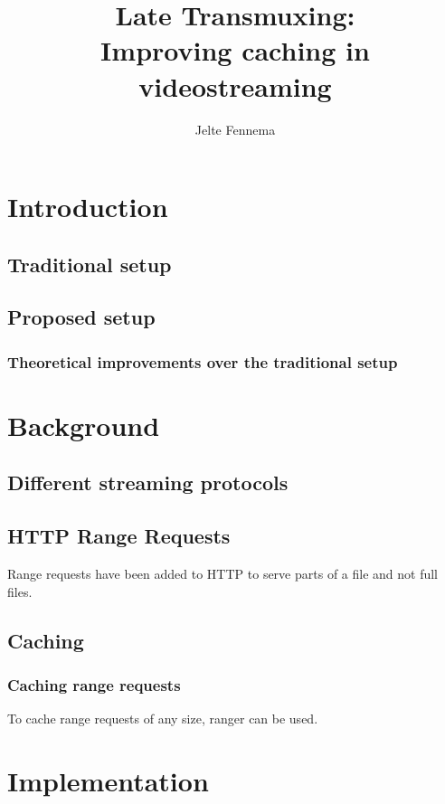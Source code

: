 \documentclass[twoside,openright]{uva-bachelor-thesis}
\title{Late Transmuxing:\\Improving caching in videostreaming}
\author{Jelte Fennema}
\begin{document}
\maketitle

\begin{abstract}
\end{abstract}


\tableofcontents

\chapter{Introduction}
\section{Traditional setup}
\section{Proposed setup}
\subsection{Theoretical improvements over the traditional setup}

\chapter{Background}
\section{Different streaming protocols}
\section{HTTP Range Requests}
Range requests have been added to HTTP to serve parts of a file and not full
files.~\autocite{rangerequests}
\section{Caching}
\subsection{Caching range requests}
To cache range requests of any size, ranger \autocite{ranger} can be used.



\chapter{Implementation}
\end{document}
